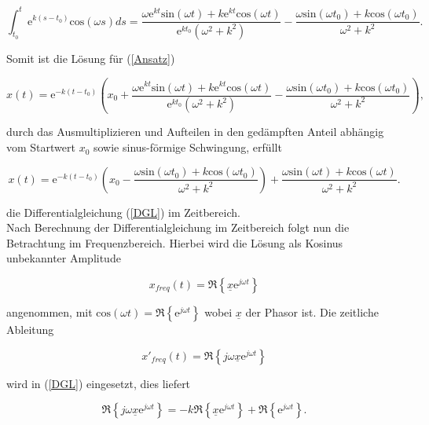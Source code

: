 \begin{equation*}
	\int_{t_0}^{t}\mathrm{e}^{k(s-t_0)}\mathrm{cos}(\omega s)ds = 
	\frac{\omega \mathrm{e}^{kt}\mathrm{sin}(\omega t)+k\mathrm{e}^{kt}\mathrm{cos}(\omega t)}{\mathrm{e}^{kt_0}(\omega^2+k^2)}-\frac{\omega \mathrm{sin}(\omega t_0)+k\mathrm{cos}(\omega t_0)}{\omega^2+k^2}.
\end{equation*}

Somit ist die Lösung für (\ref{Ansatz})

\begin{equation*}
	x(t)=\mathrm{e}^{-k(t-t_0)} \left(x_0+\frac{\omega \mathrm{e}^{kt}\mathrm{sin}(\omega t)+k\mathrm{e}^{kt}\mathrm{cos}(\omega t)}{\mathrm{e}^{kt_0}(\omega^2+k^2)}-\frac{\omega \mathrm{sin}(\omega t_0)+k\mathrm{cos}(\omega t_0)}{\omega^2+k^2}\right),
\end{equation*}

durch das Ausmultiplizieren und Aufteilen in den gedämpften Anteil abhängig vom Startwert $x_0$ sowie sinus-förmige Schwingung, erfüllt

\begin{equation}
	x(t) = \mathrm{e}^{-k(t-t_0)}\left(x_0-\frac{\omega \mathrm{sin}(\omega t_0)+k\mathrm{cos}(\omega t_0)}{\omega^2+k^2}\right)+\frac{\omega \mathrm{sin}(\omega t)+k\mathrm{cos}(\omega t)}{\omega^2+k^2}.
	\label{allgemeineLösung}
\end{equation}

die Differentialgleichung (\ref{DGL}) im Zeitbereich.\\

Nach Berechnung der Differentialgleichung im Zeitbereich folgt nun die Betrachtung im Frequenzbereich. Hierbei wird die Lösung als Kosinus unbekannter Amplitude

\begin{equation*}
	x_{freq} (t) = \Re \left\{\underline{x}\mathrm{e}^{j\omega t}\right\}
\end{equation*}

angenommen, mit $\mathrm{cos}(\omega t) = \Re\left\{\mathrm{e}^{j\omega t}\right\}$ wobei $\underline{x}$ der Phasor ist. Die zeitliche Ableitung 

\begin{equation*}
	x'_{freq}(t) = \Re \left\{j\omega \underline{x} \mathrm{e}^{j\omega t}\right\}
\end{equation*}

wird in (\ref{DGL}) eingesetzt, dies liefert

\begin{equation*}
	\Re \left\{j\omega \underline{x} \mathrm{e}^{j\omega t}\right\} = -k\Re\left\{\underline{x}\mathrm{e}^{j\omega t}\right\} + \Re\left\{\mathrm{e}^{j\omega t}\right\}.
\end{equation*}

